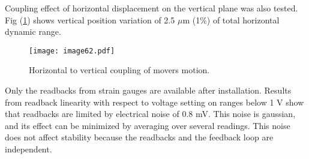 Coupling effect of horizontal displacement on the vertical plane was also tested. Fig (\ref{f:Cedratcoupling}) shows vertical position variation of 2.5 $\mu$m (1\%) of total horizontal dynamic range.\par
\begin{figure}[!htb]
\centering
\texttt{[image: image62.pdf]}\caption{Horizontal to vertical coupling of movers motion.}\label{f:Cedratcoupling}
\end{figure}
Only the readbacks from strain gauges are available after installation. Results from readback linearity with respect to voltage setting on ranges below 1 V show that readbacks are limited by electrical noise of $0.8$ mV. This noise is gaussian, and its effect can be minimized by averaging over several readings. This noise does not affect stability because the readbacks and the feedback loop are independent.

